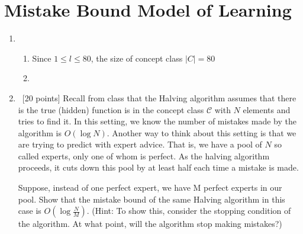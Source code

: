 \section{Mistake Bound Model of Learning}\label{sec:q2}

\begin{enumerate}
    \item~
    
    
	\begin{enumerate}
		\item
			Since $1 \leq l \leq 80$, the size of concept class $|C| = 80$	
		
		\item
				
	
	\end{enumerate}	    
    
    
    
    
    

    \item~[20 points] Recall from class that the Halving algorithm assumes that there is the true (hidden) function is in the concept class $\mathcal{C}$ with $N$ elements and tries to find it. In this setting, we know the number of mistakes made by the algorithm is $O(\log N)$.
        Another way to think about this setting is that we are trying to predict with expert advice. That is, we have a pool of $N$ so called experts, only one of whom is perfect. As the halving algorithm proceeds, it cuts down this pool by at least half each time a mistake is made.

        Suppose, instead of one perfect expert, we have M perfect experts in our pool. Show that the mistake bound of the same Halving algorithm in this case is $O(\log\frac{N}{M})$.
        (Hint: To show this, consider the stopping condition of the algorithm. At what point, will the algorithm stop making mistakes?)
\end{enumerate}

